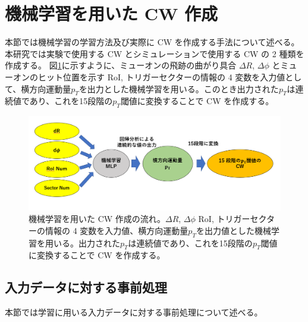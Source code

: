 \section{機械学習を用いた CW 作成}
本節では機械学習の学習方法及び実際に CW を作成する手法について述べる。
本研究では実験で使用する CW とシミュレーションで使用する CW の 2 種類を作成する。
図\ref{fig:MLP_over}に示すように、ミューオンの飛跡の曲がり具合 $\Delta R$, $\Delta \phi$ とミューオンのヒット位置を示す RoI, トリガーセクターの情報の 4 変数を入力値として、横方向運動量$p_T$を出力とした機械学習を用いる。このとき出力された$p_T$は連続値であり、これを15段階の$p_T$閾値に変換することで CW を作成する。

\begin{figure}[tb]
  \centering
  \includegraphics[clip, width=15cm]{fig/4/MLPoverview.png}
  \caption{機械学習を用いた CW 作成の流れ。$\Delta R$, $\Delta \phi$ RoI, トリガーセクターの情報の 4 変数を入力値、横方向運動量$p_T$を出力値とした機械学習を用いる。出力された$p_T$は連続値であり、これを15段階の$p_T$閾値に変換することで CW を作成する。}
  \label{fig:MLP_over}
\end{figure}

\subsection{入力データに対する事前処理}
本節では学習に用いる入力データに対する事前処理について述べる。
